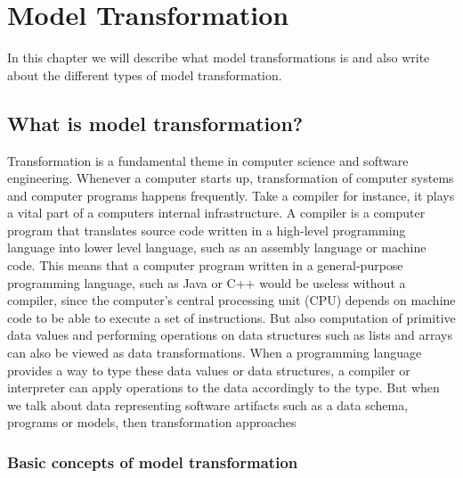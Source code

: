 
\chapter{Model Transformation} %

\label{Chapte3} %


In this chapter we will describe what model transformations is and also write
about the different types of model transformation. 

\section{What is model transformation?}

Transformation is a fundamental theme in computer science and software
engineering. Whenever a computer starts up, transformation of computer systems
and computer programs happens frequently. Take a compiler for instance, it plays
a vital part of a computers internal infrastructure. A compiler is a computer
program that translates source code written in a high-level programming
language into lower level language, such as an assembly language or machine
code. This means that a computer program written in a general-purpose
programming language, such as Java or C++ would be useless without a compiler,
since the computer's central processing unit (CPU) depends on machine code to be
able to execute a set of instructions. But also computation of primitive data
values and performing operations on data structures such as lists and arrays can
also be viewed as data transformations. When a programming language provides a way
to type these data values or data structures, a compiler or interpreter can
apply operations to the data accordingly to the type. But when we talk about
data representing software artifacts such as a data schema, programs or models,
then transformation approaches 

\subsection{Basic concepts of model transformation}

